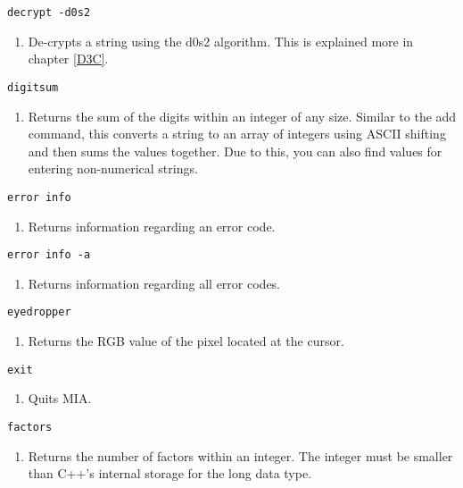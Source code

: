 \begin{lstlisting} 
decrypt -d0s2   
\end{lstlisting}
\begin{enumerate}
	\item[] De-crypts a string using the d0s2 algorithm. This is explained more in chapter \ref{D3C}.
\end{enumerate}

\begin{lstlisting} 
digitsum 
\end{lstlisting}
\begin{enumerate}
	\item[] Returns the sum of the digits within an integer of any size. Similar to the add command, this converts a string to an array of integers using ASCII shifting and then sums the values together. Due to this, you can also find values for entering non-numerical strings.
\end{enumerate}

\begin{lstlisting} 
error info
\end{lstlisting}
\begin{enumerate}
	\item[] Returns information regarding an error code.
\end{enumerate}

\begin{lstlisting} 
error info -a
\end{lstlisting}
\begin{enumerate}
\item[] Returns information regarding all error codes.
\end{enumerate}

\begin{lstlisting} 
eyedropper
\end{lstlisting}
\begin{enumerate}
	\item[] Returns the RGB value of the pixel located at the cursor.
\end{enumerate}

\begin{lstlisting} 
exit  
\end{lstlisting}
\begin{enumerate}
	\item[] Quits MIA. 
\end{enumerate}

\begin{lstlisting} 
factors   
\end{lstlisting}
\begin{enumerate}
	\item[] Returns the number of factors within an integer. The integer must be smaller than C++'s internal storage for the long data type.
\end{enumerate}

